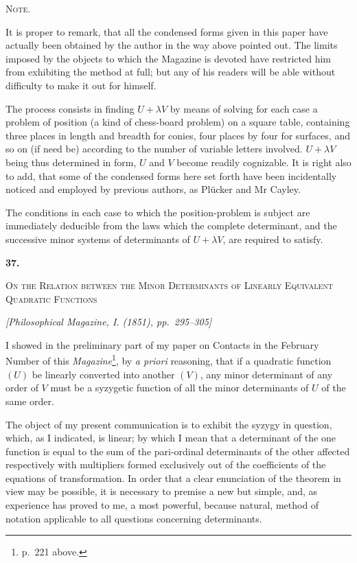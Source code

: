 \documentclass[11pt]{article}
\newcommand{\paperhead}[3]{%
  \clearpage
  \begin{center}
  {\Large\bfseries #1.}\par\vspace{0.85em}
  {\large\scshape #2}\par\vspace{0.6em}
  {\itshape [#3]}\par
  \end{center}\vspace{0.4em}}
\newcommand{\sourcepage}[1]{\marginpar{\scriptsize p.~#1}}
\begin{document}
{{\begin{center}{\scshape Note.}\end{center}

It is proper to remark, that all the condensed forms given in this paper have actually been obtained by the author in the way above pointed out. The limits imposed by the objects to which the Magazine is devoted have restricted him from exhibiting the method at full; but any of his readers will be able without difficulty to make it out for himself.

The process consists in finding $U+\lambda V$ by means of solving for each case a problem of position (a kind of chess-board problem) on a square table, containing three places in length and breadth for conies, four places by four for surfaces, and so on (if need be) according to the number of variable letters involved. $U+\lambda V$ being thus determined in form, $U$ and $V$ become readily cognizable. It is right also to add, that some of the condensed forms here set forth have been incidentally noticed and employed by previous authors, as Plücker and Mr Cayley.

The conditions in each case to which the position-problem is subject are immediately deducible from the laws which the complete determinant, and the successive minor systems of determinants of $U+\lambda V$, are required to satisfy.



\paperhead{37}{On the Relation between the Minor Determinants of Linearly Equivalent Quadratic Functions}{Philosophical Magazine, I. (1851), pp.~295--305}

\sourcepage{241}
I showed in the preliminary part of my paper on Contacts in the February Number of this \emph{Magazine}\footnote{p.~221 above.}, by \emph{a priori} reasoning, that if a quadratic function $(U)$ be linearly converted into another $(V)$, any minor determinant of any order of $V$ must be a syzygetic function of all the minor determinants of $U$ of the same order.

The object of my present communication is to exhibit the syzygy in question, which, as I indicated, is linear; by which I mean that a determinant of the one function is equal to the sum of the pari-ordinal determinants of the other affected respectively with multipliers formed exclusively out of the coefficients of the equations of transformation. In order that a clear enunciation of the theorem in view may be possible, it is necessary to premise a new but simple, and, as experience has proved to me, a most powerful, because natural, method of notation applicable to all questions concerning determinants.

}}
\end{document}
